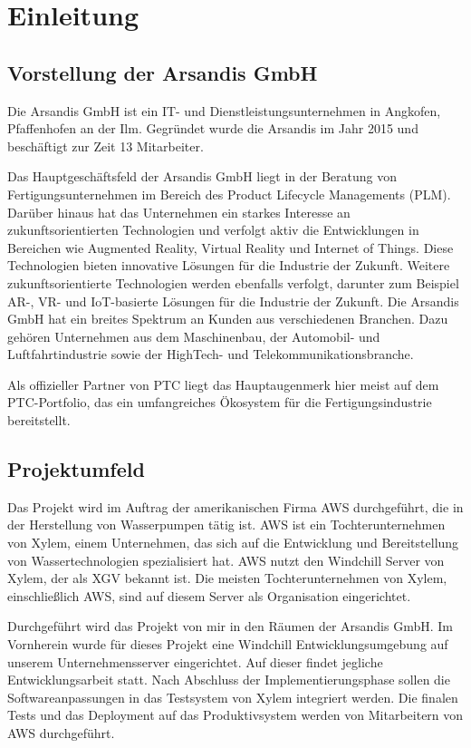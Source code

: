 \section{Einleitung}
\label{sec:Einleitung}

\subsection{Vorstellung der Arsandis GmbH}
\label{sec:Vorstellung_Arsandis}
Die Arsandis GmbH ist ein IT- und Dienstleistungsunternehmen in Angkofen, Pfaffenhofen an der Ilm.
Gegründet wurde die Arsandis im Jahr 2015 und beschäftigt zur Zeit 13 Mitarbeiter.

Das Hauptgeschäftsfeld der Arsandis GmbH liegt in der Beratung von Fertigungsunternehmen im Bereich des Product Lifecycle Managements (PLM).
Darüber hinaus hat das Unternehmen ein starkes Interesse an zukunftsorientierten Technologien und verfolgt aktiv die Entwicklungen in Bereichen wie Augmented Reality, Virtual Reality und Internet of Things.
Diese Technologien bieten innovative Lösungen für die Industrie der Zukunft.
Weitere zukunftsorientierte Technologien werden ebenfalls verfolgt, darunter zum Beispiel AR-, VR- und IoT-basierte Lösungen für die Industrie der Zukunft.
Die Arsandis GmbH hat ein breites Spektrum an Kunden aus verschiedenen Branchen.
Dazu gehören Unternehmen aus dem Maschinenbau, der Automobil- und Luftfahrtindustrie sowie der HighTech- und Telekommunikationsbranche.

Als offizieller Partner von PTC liegt das Hauptaugenmerk hier meist auf dem PTC-Portfolio, das ein umfangreiches Ökosystem für die Fertigungsindustrie bereitstellt.

\subsection{Projektumfeld}
\label{sec:Projektumfeld}
Das Projekt wird im Auftrag der amerikanischen Firma \ac{AWS} durchgeführt, die in der Herstellung von Wasserpumpen tätig ist.
\ac{AWS} ist ein Tochterunternehmen von Xylem, einem Unternehmen, das sich auf die Entwicklung und Bereitstellung von Wassertechnologien spezialisiert hat.
\ac{AWS} nutzt den Windchill Server von Xylem, der als \ac{XGV} bekannt ist.
Die meisten Tochterunternehmen von Xylem, einschließlich \ac{AWS}, sind auf diesem Server als Organisation eingerichtet.

Durchgeführt wird das Projekt von mir in den Räumen der Arsandis GmbH.
Im Vornherein wurde für dieses Projekt eine Windchill Entwicklungsumgebung auf unserem Unternehmensserver eingerichtet.
Auf dieser findet jegliche Entwicklungsarbeit statt.
Nach Abschluss der Implementierungsphase sollen die Softwareanpassungen in das Testsystem von Xylem integriert werden.
Die finalen Tests und das Deployment auf das Produktivsystem werden von Mitarbeitern von AWS durchgeführt.

